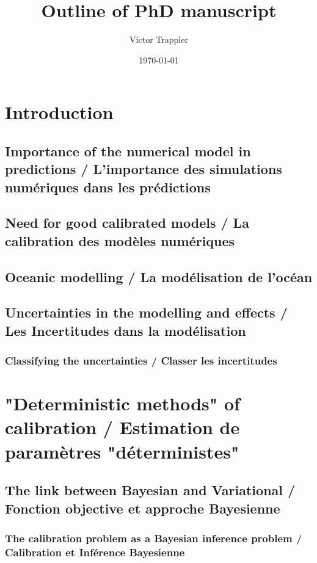 \documentclass[11pt]{article}
\author{Victor Trappler}
\date{\today}
\title{Outline of PhD manuscript}
\begin{document}
\maketitle
\tableofcontents


\section{Introduction}
\label{sec:org2bc2050}
\subsection{Importance of the numerical model in predictions / L'importance des simulations numériques dans les prédictions}
\label{sec:org8a4816c}
\subsection{Need for good calibrated models / La calibration des modèles numériques}
\label{sec:org3b26b66}
\subsection{Oceanic modelling / La modélisation de l'océan}
\label{sec:org6bc7272}
\subsection{Uncertainties in the modelling and effects / Les Incertitudes dans la modélisation}
\label{sec:org4731a58}
\subsubsection{Classifying the uncertainties / Classer les incertitudes}
\label{sec:orge738d0d}
\subsubsection{}
\label{sec:org003587a}

\section{"Deterministic methods" of calibration / Estimation de paramètres "déterministes"}
\label{sec:org7dfc209}
\subsection{The link between Bayesian and Variational / Fonction objective et approche Bayesienne}
\label{sec:org2bf321b}
\subsubsection{The calibration problem as a Bayesian inference problem / Calibration et Inférence Bayesienne}
\label{sec:org9e8c4eb}
\end{document}
